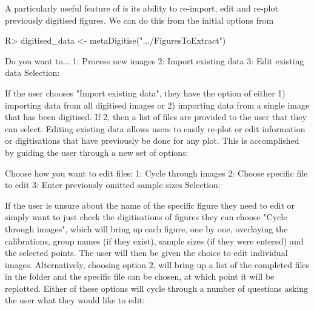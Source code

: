 \documentclass[article]{jss}
\newcommand{\fct}[1]{\code{#1()}}
\begin{document}
A particularly useful feature of  is its ability to re-import, edit and re-plot previously digitised figures. We can do this from the initial options from \fct{metaDigitise}


\begin{CodeChunk}
\begin{CodeInput}
R> digitised_data <- metaDigitise(".../FiguresToExtract")
\end{CodeInput}
\begin{CodeOutput}
    Do you want to...
1: Process new images
2: Import existing data
3: Edit existing data
Selection: 
\end{CodeOutput}
\end{CodeChunk}

If the user chooses "Import existing data", they have the option of either 1) importing data from all digitised images or 2) importing data from a single image that has been digitised. If 2, then a list of files are provided to the user that they can select. Editing existing data allows users to easily re-plot or edit information or digitisations that have previously be done for any plot. This is accomplished by guiding the user through a new set of options:

\begin{CodeChunk}
\begin{CodeOutput}
Choose how you want to edit files:
1: Cycle through images
2: Choose specific file to edit
3: Enter previously omitted sample sizes
Selection: 
\end{CodeOutput}
\end{CodeChunk}

If the user is unsure about the name of the specific figure they need to edit or simply want to just check the digitisations of figures they can choose "Cycle through images", which will bring up each figure, one by one, overlaying the calibrations, group names (if they exist), sample sizes (if they were entered) and the selected points. The user will then be given the choice to edit individual images. Alternatively, choosing option 2, will bring up a list of the completed files in the folder and the specific file can be chosen, at which point it will be replotted. Either of these options will cycle through a number of questions asking the user what they would like to edit:
\end{document}
